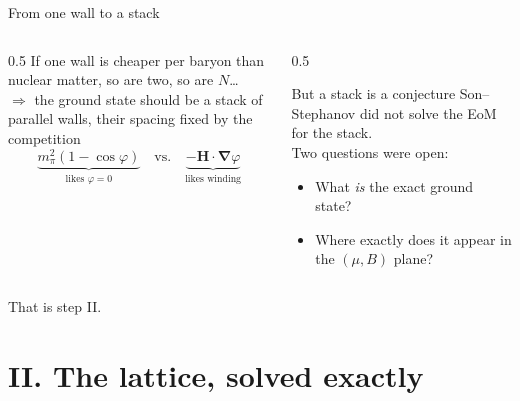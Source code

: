 \documentclass[aspectratio=169,10pt]{beamer}
\newcommand{\Hb}{\bm{H}}
\newcommand{\gr}{\bm{\nabla}}
\newcommand{\mpi}{m_\pi}
\begin{document}
\begin{frame}{From one wall to a stack}
\begin{columns}[T,onlytextwidth]
\begin{column}{0.5\textwidth}
If one wall is cheaper per baryon than nuclear matter, so are two, so are
$N$\dots\\[2mm]
$\Rightarrow$ the ground state should be a \alert{stack of parallel walls},
their spacing fixed by the competition
\[
 \underbrace{\mpi^2(1-\cos\varphi)}_{\text{likes }\varphi=0}
 \quad\text{vs.}\quad
 \underbrace{-\Hb\cdot\gr\varphi}_{\text{likes winding}}
\]
\end{column}
\begin{column}{0.5\textwidth}
\begin{block}{But a stack is a conjecture}
Son--Stephanov did not solve the EoM for the stack. \\[1.5mm]
Two questions were open:
\begin{itemize}
  \item What \emph{is} the exact ground state?
  \item Where exactly does it appear in the $(\mu,B)$ plane?
\end{itemize}
\end{block}
\end{column}
\end{columns}
\vspace{3mm}
\centering
\alert{That is step II.}
\end{frame}

\section{II. The lattice, solved exactly}
\end{document}
